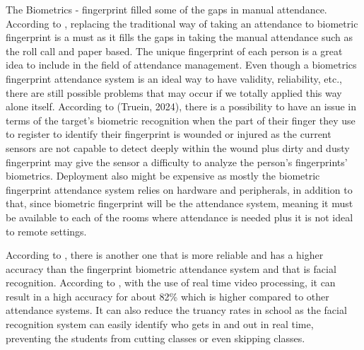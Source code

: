 The Biometrics - fingerprint filled some of the gaps in manual attendance. According to \cite{Walia:2016}, replacing the traditional way of taking an attendance to biometric fingerprint is a must as it fills the gaps in taking the manual attendance such as the roll call and paper based. The unique fingerprint of each person is a great idea to include in the field of attendance management. Even though a biometrics fingerprint attendance system is an ideal way to have validity, reliability, etc., there are still possible problems that may occur if we totally applied this way alone itself. According to (Truein, 2024), there is a possibility to have an issue in terms of the target’s biometric recognition when the part of their finger they use to register to identify their fingerprint is wounded or injured as the current sensors are not capable to detect deeply within the wound plus dirty and dusty fingerprint may give the sensor a difficulty to analyze the person’s fingerprints’ biometrics. Deployment also might be expensive as mostly the biometric fingerprint attendance system relies on hardware and peripherals, in addition to that, since biometric fingerprint will be the attendance system, meaning it must be available to each of the rooms where attendance is needed plus it is not ideal to remote settings.

According to \cite{Truein:2024}, there is another one that is more reliable and has a higher accuracy than the fingerprint biometric attendance system and that is facial recognition. According to \cite{Yang:2020}, with the use of real time video processing, it can result in a high accuracy for about 82\% which is higher compared to other attendance systems. It can also reduce the truancy rates in school as the facial recognition system can easily identify who gets in and out in real time, preventing the students from cutting classes or even skipping classes.



